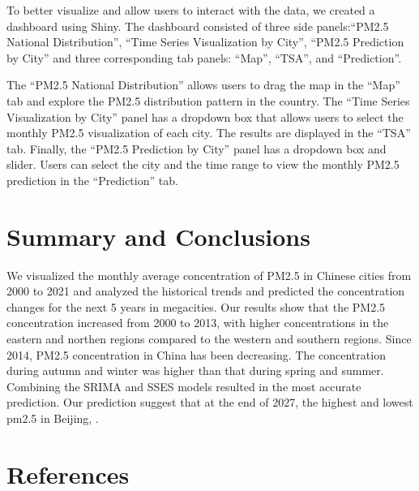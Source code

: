 \documentclass[
  12pt,
]{article}
\begin{document}
To better visualize and allow users to interact with the data, we
created a dashboard using Shiny. The dashboard consisted of three side
panels:``PM2.5 National Distribution'', ``Time Series Visualization by
City'', ``PM2.5 Prediction by City'' and three corresponding tab panels:
``Map'', ``TSA'', and ``Prediction''.

The ``PM2.5 National Distribution'' allows users to drag the map in the
``Map'' tab and explore the PM2.5 distribution pattern in the country.
The ``Time Series Visualization by City'' panel has a dropdown box that
allows users to select the monthly PM2.5 visualization of each city. The
results are displayed in the ``TSA'' tab. Finally, the ``PM2.5
Prediction by City'' panel has a dropdown box and slider. Users can
select the city and the time range to view the monthly PM2.5 prediction
in the ``Prediction'' tab.

\newpage

\hypertarget{summary-and-conclusions}{%
\section{Summary and Conclusions}\label{summary-and-conclusions}}

We visualized the monthly average concentration of PM2.5 in Chinese
cities from 2000 to 2021 and analyzed the historical trends and
predicted the concentration changes for the next 5 years in megacities.
Our results show that the PM2.5 concentration increased from 2000 to
2013, with higher concentrations in the eastern and northen regions
compared to the western and southern regions. Since 2014, PM2.5
concentration in China has been decreasing. The concentration during
autumn and winter was higher than that during spring and summer.
Combining the SRIMA and SSES models resulted in the most accurate
prediction. Our prediction suggest that at the end of 2027, the highest
and lowest pm2.5 in Beijing, .

\newpage

\hypertarget{references}{%
\section*{References}\label{references}}
\end{document}
